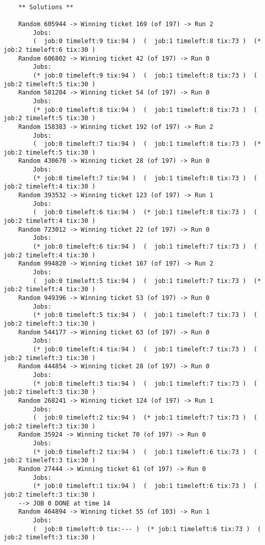 \documentclass{article}
\begin{document}
\begin{enumerate}
\begin{verbatim}
    
    ** Solutions **
    
    Random 605944 -> Winning ticket 169 (of 197) -> Run 2
        Jobs:
        (  job:0 timeleft:9 tix:94 )  (  job:1 timeleft:8 tix:73 )  (* job:2 timeleft:6 tix:30 ) 
    Random 606802 -> Winning ticket 42 (of 197) -> Run 0
        Jobs:
        (* job:0 timeleft:9 tix:94 )  (  job:1 timeleft:8 tix:73 )  (  job:2 timeleft:5 tix:30 ) 
    Random 581204 -> Winning ticket 54 (of 197) -> Run 0
        Jobs:
        (* job:0 timeleft:8 tix:94 )  (  job:1 timeleft:8 tix:73 )  (  job:2 timeleft:5 tix:30 ) 
    Random 158383 -> Winning ticket 192 (of 197) -> Run 2
        Jobs:
        (  job:0 timeleft:7 tix:94 )  (  job:1 timeleft:8 tix:73 )  (* job:2 timeleft:5 tix:30 ) 
    Random 430670 -> Winning ticket 28 (of 197) -> Run 0
        Jobs:
        (* job:0 timeleft:7 tix:94 )  (  job:1 timeleft:8 tix:73 )  (  job:2 timeleft:4 tix:30 ) 
    Random 393532 -> Winning ticket 123 (of 197) -> Run 1
        Jobs:
        (  job:0 timeleft:6 tix:94 )  (* job:1 timeleft:8 tix:73 )  (  job:2 timeleft:4 tix:30 ) 
    Random 723012 -> Winning ticket 22 (of 197) -> Run 0
        Jobs:
        (* job:0 timeleft:6 tix:94 )  (  job:1 timeleft:7 tix:73 )  (  job:2 timeleft:4 tix:30 ) 
    Random 994820 -> Winning ticket 167 (of 197) -> Run 2
        Jobs:
        (  job:0 timeleft:5 tix:94 )  (  job:1 timeleft:7 tix:73 )  (* job:2 timeleft:4 tix:30 ) 
    Random 949396 -> Winning ticket 53 (of 197) -> Run 0
        Jobs:
        (* job:0 timeleft:5 tix:94 )  (  job:1 timeleft:7 tix:73 )  (  job:2 timeleft:3 tix:30 ) 
    Random 544177 -> Winning ticket 63 (of 197) -> Run 0
        Jobs:
        (* job:0 timeleft:4 tix:94 )  (  job:1 timeleft:7 tix:73 )  (  job:2 timeleft:3 tix:30 ) 
    Random 444854 -> Winning ticket 28 (of 197) -> Run 0
        Jobs:
        (* job:0 timeleft:3 tix:94 )  (  job:1 timeleft:7 tix:73 )  (  job:2 timeleft:3 tix:30 ) 
    Random 268241 -> Winning ticket 124 (of 197) -> Run 1
        Jobs:
        (  job:0 timeleft:2 tix:94 )  (* job:1 timeleft:7 tix:73 )  (  job:2 timeleft:3 tix:30 ) 
    Random 35924 -> Winning ticket 70 (of 197) -> Run 0
        Jobs:
        (* job:0 timeleft:2 tix:94 )  (  job:1 timeleft:6 tix:73 )  (  job:2 timeleft:3 tix:30 ) 
    Random 27444 -> Winning ticket 61 (of 197) -> Run 0
        Jobs:
        (* job:0 timeleft:1 tix:94 )  (  job:1 timeleft:6 tix:73 )  (  job:2 timeleft:3 tix:30 ) 
    --> JOB 0 DONE at time 14
    Random 464894 -> Winning ticket 55 (of 103) -> Run 1
        Jobs:
        (  job:0 timeleft:0 tix:--- )  (* job:1 timeleft:6 tix:73 )  (  job:2 timeleft:3 tix:30 ) 

\end{verbatim}
\end{enumerate}
\end{document}
